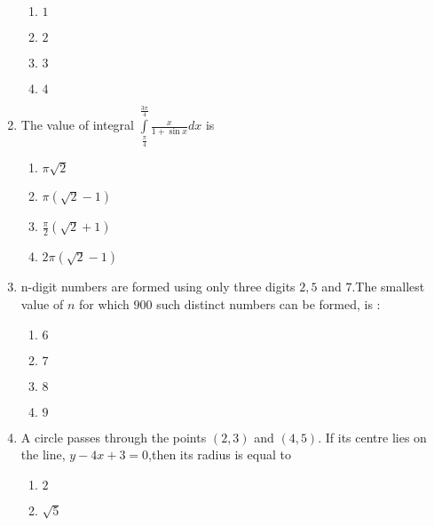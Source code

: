 \documentclass[journal,12pt,twocolumn]{IEEEtran}
\begin{document}
\begin{enumerate}[1.]
\begin{enumerate}[(1)]
\item $
1
$

\item $
2
$

\item $
3
$

\item $
4
$


\end{enumerate}

\item The value of integral $ \int\limits_{\frac{\pi}{4}} ^ {\frac{3 \pi}{4}} \frac{x}{1+\sin x}dx $ is


\begin{enumerate}[(1)]
 
\item $
\pi \sqrt{2}
$

\item $
\pi (\sqrt{2}-1)
$

\item $
\frac{\pi}{2}(\sqrt{2}+1)
$

\item $
2 \pi (\sqrt{2}-1)  
$


\end{enumerate}


\item n-digit numbers are formed using only three digits $2,5$ and $7$.The smallest value of $n$ for which $900$ such distinct numbers can be formed, is :


\begin{enumerate}[(1)]
 
\item $
6
$

\item $
7
$

\item $
8
$

\item $
9
$


\end{enumerate}

\item A circle passes through the points $(2,3)$ and $(4,5)$. If its centre lies on the line, $y-4x+3=0$,then its radius is equal to 


\begin{enumerate}[(1)]
 
\item $
2
$

\item $
\sqrt{5}
$


\end{enumerate}
\end{enumerate}
\end{document}
